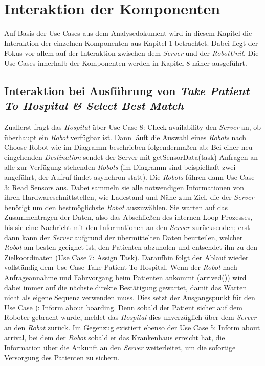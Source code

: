 \section{Interaktion der Komponenten}
Auf Basis der Use Cases aus dem Analysedokument wird in diesem Kapitel die Interaktion der einzelnen Komponenten aus Kapitel 1 betrachtet. Dabei liegt der Fokus vor allem auf der Interaktion zwischen dem \emph{Server} und der \emph{RobotUnit}. Die Use Cases innerhalb der Komponenten werden in Kapitel 8 näher ausgeführt. \\


\subsection*{Interaktion bei Ausführung von \emph{Take Patient To Hospital & Select Best Match}}

Zuallerst fragt das \emph{Hospital} über Use Case 8: Check availability den \emph{Server} an, ob überhaupt ein \emph{Robot} verfügbar ist. Dann läuft die Auswahl eines \emph{Robots} nach Choose Robot wie im Diagramm beschrieben folgendermaßen ab: Bei einer neu eingehenden \emph{Destination} sendet der Server mit getSensorData(task) Anfragen an alle zur Verfügung stehenden \emph{Robots} (im Diagramm sind beispielhaft zwei angeführt, der Aufruf findet asynchron statt). Die \emph{Robots} führen dann Use Case 3: Read Sensors aus. Dabei sammeln sie alle notwendigen Informationen von ihren Hardwareschnittstellen, wie Ladestand und Nähe zum Ziel, die der \emph{Server} benötigt um den bestmöglichste \emph{Robot} auszuwählen. Sie warten auf das Zusammentragen der Daten, also das Abschließen des internen Loop-Prozesses, bis sie eine Nachricht mit den Informationen an den \emph{Server} zurücksenden; erst dann kann der \emph{Server} aufgrund der übermittelten Daten beurteilen, welcher \emph{Robot} am besten geeignet ist, den Patienten abzuholen und entsendet ihn zu den Zielkoordinaten (Use Case 7: Assign Task). Daraufhin folgt der Ablauf wieder vollständig dem Use Case Take Patient To Hospital. Wenn der \emph{Robot} nach Anfrageannahme und Fahrvorgang beim Patienten ankommt (arrived()) wird dabei immer auf die nächste direkte Bestätigung gewartet, damit das Warten nicht als eigene Sequenz verwenden muss. Dies setzt der Ausgangspunkt für den Use Case ): Inform about boarding. Denn sobald der Patient sicher auf dem Roboter gebracht wurde, meldet das \emph{Hospital} dies unverzüglich über dem \emph{Server} an den \emph{Robot} zurück. Im Gegenzug existiert ebenso der Use Case 5: Inform about arrival, bei dem der \emph{Robot} sobald er das Krankenhaus erreicht hat, die Information über die Ankunft an den \emph{Server} weiterleitet, um die sofortige Versorgung des Patienten zu sichern.

